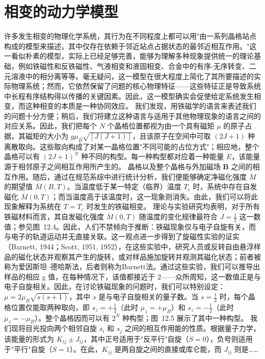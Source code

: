 \section{相变的动力学模型}\label{ux76f8ux53d8ux7684ux52a8ux529bux5b66ux6a21ux578b}
许多发生相变的物理化学系统，其行为在不同程度上都可以用"由一系列晶格站点构成的模型来描述，其中仅存在依赖于邻近站点占据状态的最邻近相互作用。"这一看似朴素的模型，实际上已经足够完善，能够为理解多种现象提供统一的理论基础，例如铁磁性和反铁磁性、气液相变和液固相变、合金中的有序-无序转变、二元溶液中的相分离等等。毫无疑问，这一模型在很大程度上简化了其所要描述的实际物理系统；然而，它依然保留了问题的核心物理特征——这些特征正是导致系统中长程有序结构得以传播的关键因素。因此，这一模型确实会促使给定系统发生相变，而这种相变的本质是一种协同效应。
我们发现，用铁磁学的语言来表述我们的问题十分方便；稍后，我们将建立这种语言与适用于其他物理现象的语言之间的对应关系。因此，我们把每个 \(N\) 个晶格位置都视为由一个具有磁矩 \(\mu\) 的原子占据，其磁矩的大小为 \(g\mu_{B}\sqrt{[J(J+1)]}\)，且该原子在空间中可取 \((2J+1)\) 种离散取向。这些取向构成了对某一晶格位置"不同可能的占位方式"；相应地，整个晶格可以有 \((2J+1)^{N}\) 种不同的构型。每一种构型都对应着一种能量 \(E\)，该能量源于相邻原子之间相互作用所产生的。
晶格以及整个晶格与外加磁场 \(\boldsymbol{B}\) 之间的相互作用。随后，通过在规范系综中进行统计分析，我们便能够确定净磁化强度 \(M\) 的期望值 \(\overline{M}(B,T)\)。当温度低于某一特定（临界）温度 \(T_c\) 时，系统中存在自发磁化 \(\overline{M}(0,T)\)；而当温度高于该温度时，这一现象则消失。由此，我们可以将此现象解释为系统在 \(T=T_c\) 时发生的铁磁相变。
理论与实验研究均表明，对于所有铁磁材料而言，其自发磁化强度 \(\overline{M}(0,T)\) 随温度的变化规律最符合 \(J=\frac{1}{2}\) 这一数值；参见图~12.4。因此，人们不禁倾向于推断：铁磁现象仅与电子自旋有关，而与电子的轨道运动并无直接关联。这一观点进一步得到了旋磁性实验的证实（Barnett, 1944；Scott, 1951, 1952），在这些实验中，研究人员或反转自由悬浮样品的磁化状态并观察其产生的旋转，或对样品施加旋转并观测其磁化状态；前者被称为爱因斯坦--德哈斯法，后者则称为Barnett法。通过这些实验，我们可以推导出样品的相应 g 值，在每种情况下，该值都接近于 2——众所周知，这一数值正是与电子自旋相关。因此，在讨论铁磁现象的问题时，我们可以特别设定：\(\mu=2\mu_{B}\sqrt{s(s+1)}\)，其中 \(s\) 是与电子自旋相关的量子数。当 \(s=\frac{1}{2}\) 时，每个晶格位置仅能取两种取向，即 \(s_{z}=+\frac{1}{2}\)（此时 \(\mu_{z}=+\mu_{B}\)）和 \(s_{z}=-\frac{1}{2}\)（此时 \(\mu_{z}=-\mu_{B}\)）。整个晶格因而可以有 \(2^{N}\) 种构型；图~12.5 展示了其中一种构型。
我们现将目光投向两个相邻自旋 \(s_i\) 和 \(s_j\) 之间的相互作用能的性质。根据量子力学，该能量的形式为 \(K_{ij} \pm J_{ij}\)，其中正号适用于"反平行"自旋（\(S=0\)），负号则适用于"平行"自旋（\(S=1\)）。在此，\(K_{ij}\) 是两自旋之间的直接或库仑能，而 \(J_{ij}\) 则是\ldots\ldots{}
